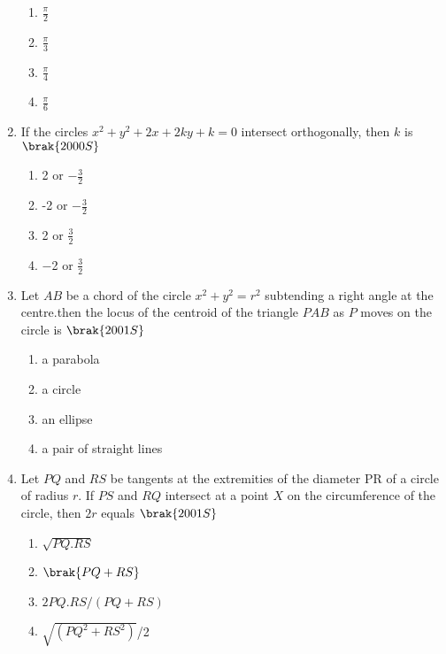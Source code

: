 \begin{enumerate}
\begin{multicols}{2}
\begin{enumerate}
        \item $\frac{\pi}{2}$
        \item $\frac{\pi}{3}$
        \item $\frac{\pi}{4}$
        \item $\frac{\pi}{6}$
    \end{enumerate}
    \end{multicols}
     \item If the circles $x^2+y^2+2x+2ky+k=0$ intersect orthogonally, then $k$ is
        \hfill$\brak{2000S}$
    \begin{multicols}{2}
    \begin{enumerate}
        \item 2 or $-\frac{3}{2}$
        \item -2 or $-\frac{3}{2}$
        \item 2 or $\frac{3}{2}$
        \item $-$2 or $\frac{3}{2}$
    \end{enumerate}
    \end{multicols}
    \item Let $AB$ be a chord of the circle $x^2+y^2=r^2$ subtending a right angle at the centre.then the locus of the centroid of the triangle $PAB$  as $P$ moves on the circle is 
        \hfill$\brak{2001S}$
        \begin{multicols}{2}
    \begin{enumerate}
        \item a parabola
        \item a circle
        \item an ellipse
        \item a pair of straight lines
        \end{enumerate}
        \end{multicols}
        \item Let $PQ$ and $RS$ be tangents at the extremities of the diameter PR of a circle of radius $r$. If $PS$ and $RQ$ intersect at a point $X$ on the circumference of the circle,  then $2r$ equals
        \hfill$\brak{2001S}$
        \begin{multicols}{2}
        \begin{enumerate}
    \item $\sqrt{PQ.RS}$
     \item $\brak{PQ+RS}$
    \item $2PQ.RS/(PQ+RS)$
     \item {$\sqrt{(PQ^2+RS^2)}$}/2
     \end{enumerate}

\end{multicols}
\end{enumerate}
